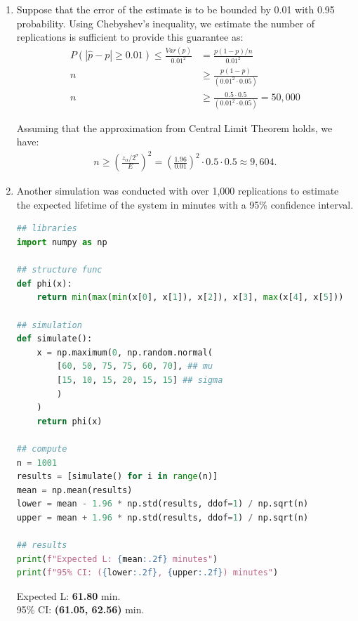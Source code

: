 \documentclass{article}
\begin{document}
\begin{enumerate}
\begin{enumerate}
    \item Suppose that the error of the estimate is to be bounded by 0.01 with 0.95 probability. Using Chebyshev’s inequality, we estimate the number of replications is sufficient to provide this guarantee as:
    \begin{equation}
        \begin{split}
            P(|\hat{p}-p| \geq 0.01) \leq \frac{Var(\hat{p})}{0.01^2} &= \frac{p(1-p)/n}{0.01^2}\\
n &\geq \frac{p(1-p)}{(0.01^2 \cdot 0.05)}\\
n &\geq \frac{0.5 \cdot 0.5}{(0.01^2 \cdot 0.05)} = 50,000
        \end{split} 
    \end{equation}

    Assuming that the approximation from Central Limit Theorem holds, we have:
    \begin{equation}
        \begin{split}
          n \geq \left(\frac{z_\alpha/2^\sigma}{E}\right)^2 = \left(\frac{1.96}{0.01}\right)^2 \cdot 0.5 \cdot 0.5 \approx 9,604.
        \end{split}
    \end{equation}
    
\item Another simulation was conducted with over 1,000 replications to estimate the expected lifetime of the system in minutes with a 95\% confidence interval.
    
\begin{lstlisting}[language=Python, title=Fig. Python 2(d)]
## libraries
import numpy as np

## structure func
def phi(x):
    return min(max(min(x[0], x[1]), x[2]), x[3], max(x[4], x[5]))

## simulation
def simulate():
    x = np.maximum(0, np.random.normal(
        [60, 50, 75, 75, 60, 70], ## mu
        [15, 10, 15, 20, 15, 15] ## sigma
        )
    )
    return phi(x)

## compute 
n = 1001
results = [simulate() for i in range(n)]
mean = np.mean(results)
lower = mean - 1.96 * np.std(results, ddof=1) / np.sqrt(n)
upper = mean + 1.96 * np.std(results, ddof=1) / np.sqrt(n)

## results 
print(f"Expected L: {mean:.2f} minutes")
print(f"95% CI: ({lower:.2f}, {upper:.2f}) minutes")
\end{lstlisting}

    Expected L: \textbf{61.80} min.\\
    95\% CI: \textbf{(61.05, 62.56)} min.\\


\end{enumerate}
\end{enumerate}
\end{document}
